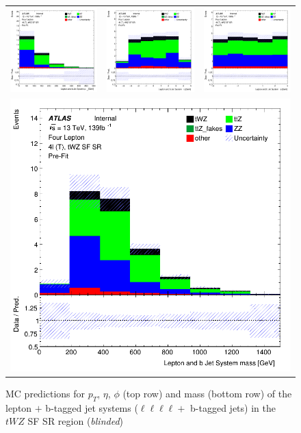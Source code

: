\begin{figure}[htbp]
\centering
  \begin{tabular}{ccc}

    \includegraphics[width=.2\textwidth]{figures/PreFitPlots/lep4_tWZ_4T_SF_bJets_Leps_sys_pt}&
    \includegraphics[width=.2\textwidth]{figures/PreFitPlots/lep4_tWZ_4T_SF_bJets_Leps_sys_eta} &
    \includegraphics[width=.2\textwidth]{figures/PreFitPlots/lep4_tWZ_4T_SF_bJets_Leps_sys_phi} \\
    \multicolumn{3}{c}{\includegraphics[width=.2\textwidth]{figures/PreFitPlots/lep4_tWZ_4T_SF_bJets_Leps_sys_mass}}

  \end{tabular}
    \caption{MC predictions for $p_{T}$, $\eta$, $\phi$ (top row) and mass (bottom row) of the lepton $+$ b-tagged jet systems ($\ell \ell \ell \ell + $ b-tagged jets) in the $tWZ$ SF SR region (\textit{blinded})}
  \label{fig:4lep-SF-SR-bjet-and-leps-sys-Plots}
\end{figure}
\clearpage

